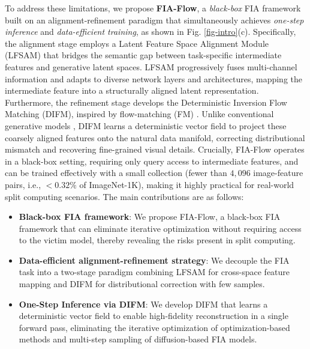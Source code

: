 To address these limitations, we propose \textbf{FIA-Flow}, a \textit{black-box} FIA framework built on an alignment-refinement paradigm that simultaneously achieves \textit{one-step inference} and \textit{data-efficient training}, as shown in Fig. \ref{fig-intro}(c).
Specifically, the alignment stage employs a Latent Feature Space Alignment Module (LFSAM) that bridges the semantic gap between task-specific intermediate features and generative latent spaces.
LFSAM progressively fuses multi-channel information and adapts to diverse network layers and architectures, mapping the intermediate feature into a structurally aligned latent representation.
Furthermore, the refinement stage develops the Deterministic Inversion Flow Matching (DIFM), inspired by flow-matching (FM) \cite{lipman2022flow}. 
Unlike conventional generative models \cite{liu2022flowstraightfastlearning,zhu2024flowie}, DIFM learns a deterministic vector field to project these coarsely aligned features onto the natural data manifold, correcting distributional mismatch and recovering fine-grained visual details.
Crucially, FIA-Flow operates in a black-box setting, requiring only query access to intermediate features, and can be trained effectively with a small collection (fewer than $4,096$ image-feature pairs, i.e., $<0.32\%$ of ImageNet-1K), making it highly practical for real-world split computing scenarios.
The main contributions are as follows:
\begin{itemize}
    \item \textbf{Black-box FIA framework}: We propose FIA-Flow, a black-box FIA framework that can eliminate iterative optimization without requiring access to the victim model, thereby revealing the risks present in split computing.
    \item \textbf{Data-efficient alignment-refinement strategy}: We decouple the FIA task into a two-stage paradigm combining LFSAM for cross-space feature mapping and DIFM for distributional correction with few samples.
    \item \textbf{One-Step Inference via DIFM}: We develop DIFM that learns a deterministic vector field to enable high-fidelity reconstruction in a single forward pass, eliminating the iterative optimization of optimization-based methods and multi-step sampling of diffusion-based FIA models. 
\end{itemize}
